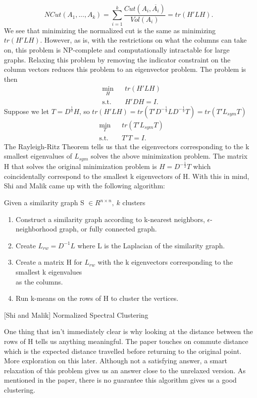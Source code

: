 \documentclass{article}
\begin{document}
\[NCut(A_1, ..., A_k) = \sum_{i=1}^{k}\frac{Cut(A_i, \overline{A_i})}{Vol(A_i)} = tr(H'LH).\] We see that minimizing the normalized cut is the same as minimizing $tr(H'LH)$. However, as is, with the restrictions on what the columns can take on, this problem is NP-complete and computationally intractable for large graphs.  
Relaxing this problem by removing the indicator constraint on the column vectors reduces this problem to an eigenvector problem. The problem is then \begin{equation*}
\begin{aligned}
& \underset{H}{\text{min}}
& & tr(H'LH) \\
& \text{s.t.}
& & H'DH = I.
\end{aligned}
\end{equation*}
Suppose we let $T = D^{\frac{1}{2}}H$, so  $tr(H'LH) = tr(T'D^{-\frac{1}{2}}LD^{-\frac{1}{2}}T) = tr(T'L_{sym}T)$
\begin{equation*}
\begin{aligned}
& \underset{T}{\text{min}} 
& & tr(T'L_{sym}T) \\
& \text{s.t.}
& & T'T = I.
\end{aligned}
\end{equation*}
The Rayleigh-Ritz Theorem tells us that the eigenvectors corresponding to the k smallest eigenvalues of $L_{sym}$ solves the above minimization problem. The matrix H that solves the original minimization problem is $H = D^{-\frac{1}{2}}T$ which coincidentally correspond to the smallest k eigenvectors of H. With this in mind, Shi and Malik came up with the following algorithm: \\[1em]
\begin{algorithm}[H]
\SetAlgoLined
{}
 Given a similarity graph S $\in R^{n \times n}, \ k$ clusters \\
 \begin{enumerate}
     \item Construct a similarity graph according to k-nearest neighbors, $\epsilon$-neighborhood graph, or fully connected graph.
     \item Create $L_{rw} = D^{-1}L$ where L is the Laplacian of the similarity graph. 
     \item Create a matrix H for $L_{rw}$ with the k eigenvectors corresponding to the smallest k eigenvalues \\ as the columns.
     \item Run k-means on the rows of H to cluster the vertices. 
 \end{enumerate}
 \caption{[Shi and Malik] Normalized Spectral Clustering}
\end{algorithm} 
One thing that isn't immediately clear is why looking at the distance between the rows of H tells us anything meaningful. The paper touches on commute distance which is the expected distance travelled before returning to the original point. More exploration on this later. Although not a satisfying answer, a smart relaxation of this problem gives us an answer close to the unrelaxed version. As mentioned in the paper, there is no guarantee this algorithm gives us a good clustering. 
\end{document}
